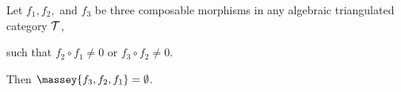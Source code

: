 \begin{proposition}
    Let \( f_1, f_2, \) and \( f_3 \) be three composable morphisms in any algebraic triangulated category \( {\mathcal{T}} \),
	\begin{center}
	\end{center}
    such that \( f_2 \circ f_1 \neq 0 \) or \( f_3 \circ f_2 \neq 0 \).

	Then \( \massey{f_3, f_2, f_1} = \emptyset \).
\end{proposition}
